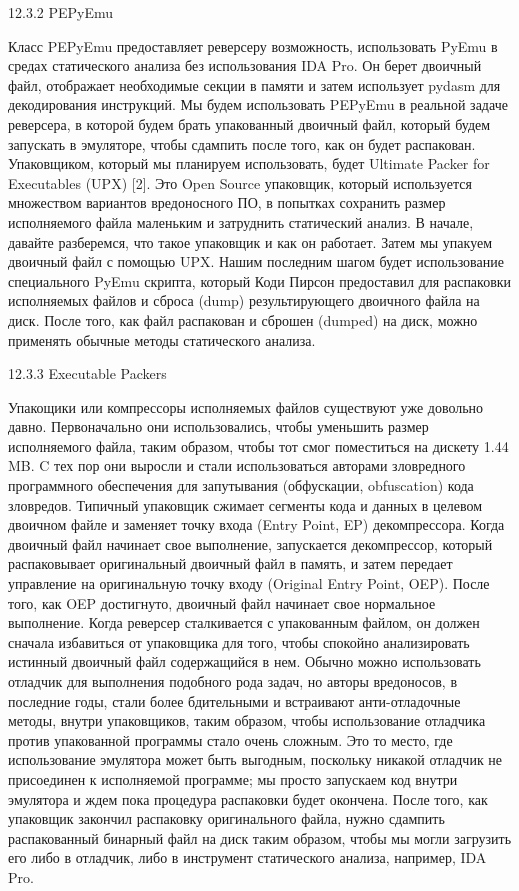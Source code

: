 \documentclass[12pt]{book}
\begin{document}
12.3.2 PEPyEmu

Класс PEPyEmu предоставляет реверсеру возможность, использовать PyEmu в средах статического анализа без использования IDA Pro. Он берет двоичный файл, отображает необходимые секции в памяти и затем использует pydasm для декодирования инструкций. Мы будем использовать PEPyEmu в реальной задаче реверсера, в которой будем брать упакованный двоичный файл, который будем запускать в эмуляторе, чтобы сдампить после того, как он будет распакован. Упаковщиком, который мы планируем использовать, будет Ultimate Packer for Executables (UPX) [2]. Это Open Source упаковщик, который используется множеством вариантов вредоносного ПО, в попытках сохранить размер исполняемого файла маленьким и затруднить статический анализ. В начале, давайте разберемся, что такое упаковщик и как он работает. Затем мы упакуем двоичный файл с помощью UPX. Нашим последним шагом будет использование специального PyEmu скрипта, который Коди Пирсон предоставил для распаковки исполняемых файлов и сброса (dump) результирующего двоичного файла на диск. После того, как файл распакован и сброшен (dumped) на диск, можно применять обычные методы статического анализа.

12.3.3 Executable Packers

Упакощики или компрессоры исполняемых файлов существуют уже довольно давно. Первоначально они использовались, чтобы уменьшить размер исполняемого файла, таким образом, чтобы тот смог поместиться на дискету 1.44 MB. C тех пор они выросли и стали использоваться авторами зловредного программного обеспечения для запутывания (обфускации, obfuscation) кода зловредов. Типичный упаковщик сжимает сегменты кода и данных в целевом двоичном файле и заменяет точку входа (Entry Point, EP) декомпрессора. Когда двоичный файл начинает свое выполнение, запускается декомпрессор, который распаковывает оригинальный двоичный файл в память, и затем передает управление на оригинальную точку входу (Original Entry Point, OEP). После того, как OEP достигнуто, двоичный файл начинает свое нормальное выполнение. Когда реверсер сталкивается с упакованным файлом, он должен сначала избавиться от упаковщика для того, чтобы спокойно анализировать истинный двоичный файл содержащийся в нем. Обычно можно использовать отладчик для выполнения подобного рода задач, но авторы вредоносов, в последние годы, стали более бдительными и встраивают анти-отладочные методы, внутри упаковщиков, таким образом, чтобы использование отладчика против упакованной программы стало очень сложным. Это то место, где использование эмулятора может быть выгодным, поскольку никакой отладчик не присоединен к исполняемой программе; мы просто запускаем код внутри эмулятора и ждем пока процедура распаковки будет окончена. После того, как упаковщик закончил распаковку оригинального файла, нужно сдампить распакованный бинарный файл на диск таким образом, чтобы мы могли загрузить его либо в отладчик, либо в инструмент статического анализа, например, IDA Pro.
\end{document}
